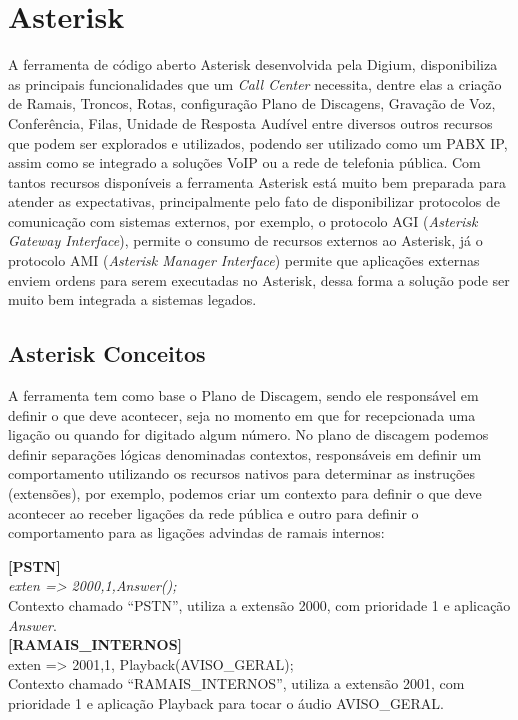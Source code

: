 \section{Asterisk}
A ferramenta de código aberto Asterisk desenvolvida pela Digium, disponibiliza as principais funcionalidades que um \textit{Call Center} necessita, dentre elas a criação de Ramais, Troncos, Rotas, configuração Plano de Discagens, Gravação de Voz, Conferência, Filas, Unidade de Resposta Audível entre diversos outros recursos que podem ser explorados e utilizados, podendo ser utilizado como um PABX IP, assim como se integrado a soluções VoIP ou a rede de telefonia pública.
Com tantos recursos disponíveis a ferramenta Asterisk está muito bem preparada para atender as expectativas, principalmente pelo fato de disponibilizar protocolos de comunicação com sistemas externos, por exemplo, o protocolo AGI (\textit{Asterisk Gateway Interface}), permite o consumo de recursos externos ao Asterisk, já o protocolo AMI (\textit{Asterisk Manager Interface}) permite que aplicações externas enviem ordens para serem executadas no Asterisk, dessa forma a solução pode ser muito bem integrada a sistemas legados.


\subsection{Asterisk Conceitos}

A ferramenta tem como base o Plano de Discagem, sendo ele responsável em definir o que deve acontecer, seja no momento em que for recepcionada uma ligação ou quando for digitado algum número. No plano de discagem podemos definir separações lógicas denominadas contextos\label{key:contexto}, responsáveis em definir um comportamento utilizando os recursos nativos para determinar as instruções (extensões), por exemplo, podemos criar um contexto para definir o que deve acontecer ao receber ligações da rede pública e outro para definir o comportamento para as ligações advindas de ramais internos:

\begin{flushleft}

\textbf{[PSTN]} \\
\textit{exten => 2000,1,Answer();} \\
Contexto chamado “PSTN”, utiliza a extensão 2000, com prioridade 1 e aplicação \textit{Answer}.\\

\textbf{[RAMAIS\_INTERNOS]} \\
exten => 2001,1, Playback(AVISO\_GERAL); \\
Contexto chamado “RAMAIS\_INTERNOS”, utiliza a extensão 2001, com prioridade 1 e aplicação Playback para tocar o áudio AVISO\_GERAL.\\
\end{flushleft}

